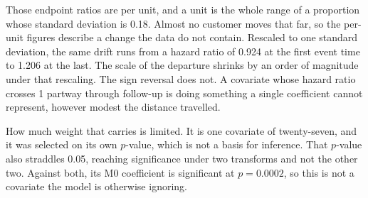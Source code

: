 Those endpoint ratios are per unit, and a unit is the whole range of a proportion whose standard deviation is 0.18. Almost no customer moves that far, so the per-unit figures describe a change the data do not contain. Rescaled to one standard deviation, the same drift runs from a hazard ratio of 0.924 at the first event time to 1.206 at the last.
The scale of the departure shrinks by an order of magnitude under that rescaling. The sign reversal does not. A covariate whose hazard ratio crosses 1 partway through follow-up is doing something a single coefficient cannot represent, however modest the distance travelled.
 
How much weight that carries is limited. It is one covariate of twenty-seven, and it was selected on its own $p$-value, which is not a basis for inference. That $p$-value also straddles 0.05, reaching significance under two transforms and not the other two. Against both, its M0 coefficient is significant at $p = 0.0002$, so this is not a covariate the model is otherwise ignoring.
 
%
%
 
